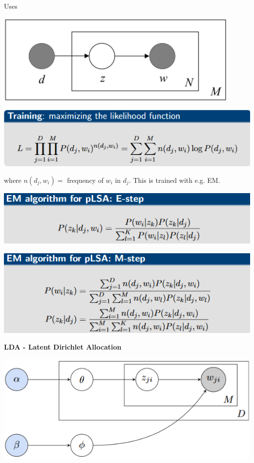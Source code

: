 \documentclass[a4paper,10pt,landscape]{article}
\newenvironment{Figure}
  {\par\medskip\noindent\minipage{\linewidth}}
  {\endminipage\par\medskip}
\begin{document}
\begin{multicols}{3}
Uses 
\begin{Figure}
    \centering
    \includegraphics[width=\linewidth]{images/pLSA.png}
    \label{fig:my_label}
\end{Figure}
\begin{Figure}
    \centering
    \includegraphics[width=\linewidth]{images/pLSATrain.png}
    \label{fig:my_label}
\end{Figure}
where $n(d_j,w_i) =$ frequency of $w_i\text{ in } d_j$. This is trained with e.g. EM. 

\includegraphics[width=.75\linewidth]{images/pLSAE.png}

\includegraphics[width=.75\linewidth]{images/pLSAM.png}

\begin{center}
{\Large \textbf{LDA - Latent Dirichlet Allocation} \par}
\end{center}

\begin{Figure}
    \centering
    \includegraphics[width=\linewidth]{images/LDA.png}
    \label{fig:my_label}
\end{Figure}


\end{multicols}
\end{document}
